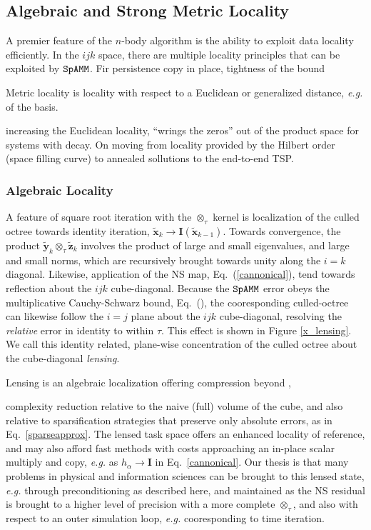 \documentclass[letterpaper,twocolumn,amsmath,amsfont,amssymb,english,aps,jcp,preprintnumbers,groupaddress,nofootinbib,tightenlines]{revtex4}
\newcommand{\mat}[1]{\boldsymbol{#1}}
\newcommand{\ot}{ {\scriptstyle \otimes}_{ \tau } }
\begin{document}
\subsection{Algebraic and Strong Metric Locality} 

A premier feature of the $n$-body algorithm is the ability to exploit data locality efficiently.  In the $ijk$ space, 
there are multiple locality principles that can be exploited by $\tt SpAMM$.  Fir
persistence
copy in place, tightness of the bound

Metric locality is locality with respect to a Euclidean or generalized distance, {\em e.g.} of the basis.  

increasing the Euclidean locality, ``wrings the zeros'' out of the product space for systems with decay.
On moving from locality provided by the Hilbert order (space filling curve) to annealed sollutions to the
end-to-end TSP.    

\subsubsection{Algebraic  Locality}

A feature of square root iteration with the $\ot$ kernel is localization of the culled octree towards identity iteration, 
$\widetilde{\mat{x}}_k \rightarrow \mat{I}\left( \widetilde{\mat{x}}_{k-1} \right)$.  Towards convergence,  
the product $\widetilde{\mat{y}}_k \ot \widetilde{\mat{z}}_k$ involves the product of large and small eigenvalues, and large and small norms, 
which are recursively brought towards unity along the $i=k$ diagonal.  Likewise, application of the NS map, Eq.~(\ref{cannonical}),  tend towards 
reflection about the $ijk$ cube-diagonal.   Because the $\tt SpAMM$ error obeys the multiplicative Cauchy-Schwarz bound, Eq.~(),  the 
cooresponding culled-octree can likewise follow the $i=j$ plane about the $ijk$ cube-diagonal, resolving the {\em relative} error in identity to within $\tau$.    This effect is shown in Figure \ref{x_lensing}.   
We call this identity related,  plane-wise concentration of the culled octree  about the cube-diagonal {\em lensing}.  

Lensing is an algebraic localization offering compression beyond  , 

complexity reduction relative to the naive (full) volume of the cube,
and also relative to sparsification strategies that preserve only absolute errors, as in Eq.~\ref{sparseapprox}.  
The lensed task space offers an enhanced locality of reference, and may also afford fast methods 
with costs approaching an in-place scalar multiply and copy, {\em e.g.} as $h_\alpha \rightarrow \mat{I}$ in Eq.~\ref{cannonical}.
Our thesis is that many problems in physical and information sciences can be brought to this lensed state, {\em e.g.} through preconditioning
as described here, and maintained as the NS residual is brought to a higher level of precision with a more complete $\ot$, 
and also with respect to an outer simulation loop, {\em e.g.} cooresponding to time iteration.
\end{document}

